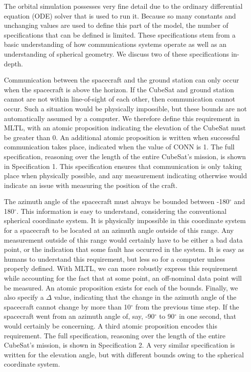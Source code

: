 \documentclass[conf]{new-aiaa}
\begin{document}
The orbital simulation possesses very fine detail due to the ordinary differential equation (ODE) solver that is used to run it. Because so many constants and unchanging values are used to define this part of the model, the number of specifications that can be defined is limited. These specifications stem from a basic understanding of how communications systems operate as well as an understanding of spherical geometry. We discuss two of these specifications in-depth. 

Communication between the spacecraft and the ground station can only occur when the spacecraft is above the horizon. If the CubeSat and ground station cannot are not within line-of-sight of each other, then communication cannot occur. Such a situation would be physically impossible, but these bounds are not automatically assumed by a computer. We therefore define this requirement in MLTL, with an atomic proposition indicating the elevation of the CubeSat must be greater than 0. An additional atomic proposition is written when successful communication takes place, indicated when the value of CONN is 1. The full specification, reasoning over the length of the entire CubeSat's mission, is shown in Specification 1. This specification ensures that communication is only taking place when physically possible, and any measurement indicating otherwise would indicate an issue with measuring the position of the craft.

The azimuth angle of the spacecraft must always be bounded between -180$^{\circ}$ and 180$^{\circ}$. This information is easy to understand, considering the conventional spherical coordinate system. It is physically impossible in this coordinate system for a spacecraft to be located at an azimuth angle outside of this range. Any measurement outside of this range would certainly have to be either a bad data point, or the indication that some fault has occurred in the system. It is easy as humans to understand this requirement, but less so for a computer unless properly defined. With MLTL, we can more robustly express this requirement while accounting for the fact that at some point, an off-nominal data point will be measured. An atomic proposition exists for each of the bounds. Finally, we also specify a $\Delta$ value, indicating that the change in the azimuth angle of the spacecraft cannot change by more than 10$^{\circ}$ from the previous time step. If the spacecraft went from an azimuth angle of, say, -90$^{\circ}$ to 90$^{\circ}$ in one second, that would certainly be concerning. A third atomic proposition encodes this requirement. The full specification, reasoning over the length of the entire CubeSat's mission, is shown in Specification 2. A very similar specification is written for the elevation angle, but with different bounds owing to the spherical coordinate system.
\end{document}
